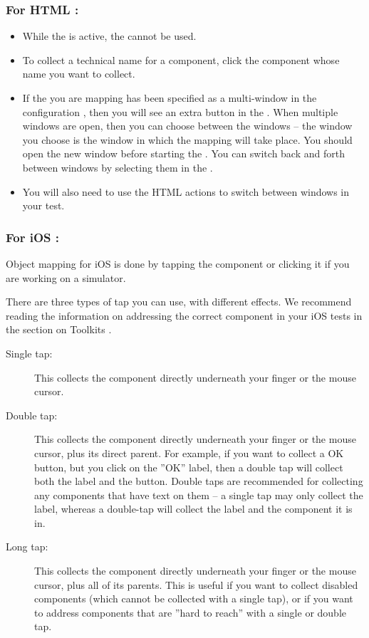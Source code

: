 \subsubsection{For HTML \gdauts{}:}
\begin{itemize}
\item While the \gdomm{} is active, the \gdaut{} cannot be used. 
\item To collect a technical name for a component, click the component whose name you want to collect. 
\item If the \gdaut{} you are mapping has been specified as a multi-window \gdaut{} in the \gdaut{} configuration , then you will see an extra button in the \gdomeditor{}. When multiple windows are open, then you can choose between the windows -- the window you choose is the window in which the mapping will take place. You should open the new window before starting the \gdomm{}. You can switch back and forth between windows by selecting them in the \gdomeditor{}. 
\item You will also need to use the HTML actions to switch between windows in your test. 
\end{itemize}

\subsubsection{For iOS \gdauts{}:}
\label{TasksOMiOS}
Object mapping for iOS \gdauts{} is done by tapping the component or clicking it if you are working on a simulator.

There are three types of tap you can use, with different effects. We recommend reading the information on addressing the correct component in your iOS tests in the section on Toolkits .
\begin{description}
\item [Single tap:]{This collects the component directly underneath your finger or the mouse cursor.}
\item [Double tap:]{This collects the component directly underneath your finger or the mouse cursor, plus its direct parent. For example, if you want to collect a OK button, but you click on the ''OK'' label, then a double tap will collect both the label and the button. Double taps are recommended for collecting any components that have text on them -- a single tap may only collect the label, whereas a double-tap will collect the label and the component it is in.}
\item [Long tap:]{This collects the component directly underneath your finger or the mouse cursor, plus all of its parents. This is useful if you want to collect disabled components (which cannot be collected with a single tap), or if you want to address components that are ''hard to reach'' with a single or double tap.}
\end{description}

